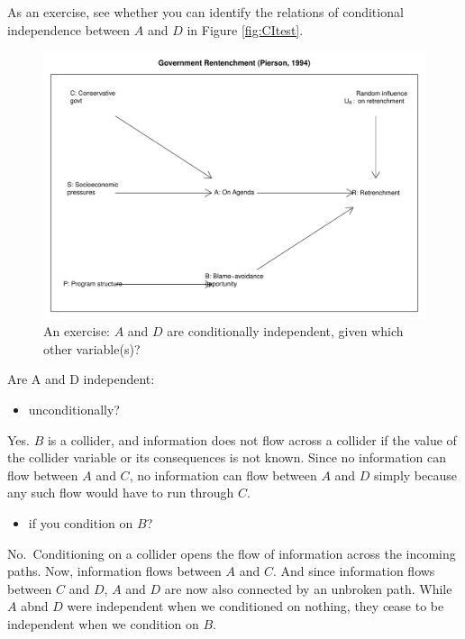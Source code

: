 \documentclass[12pt,]{book}
\providecommand{\tightlist}{%
  \setlength{\itemsep}{0pt}\setlength{\parskip}{0pt}}
\begin{document}
As an exercise, see whether you can identify the relations of conditional independence between \(A\) and \(D\) in Figure \ref{fig:CItest}.

\begin{figure}

{\centering \includegraphics[width=.9\textwidth]{ii_files/figure-latex/unnamed-chunk-7-1} 

}

\caption{\label{fig:CItest} An exercise: $A$ and $D$ are conditionally independent, given which other variable(s)?}\label{fig:unnamed-chunk-7}
\end{figure}

Are A and D independent:

\begin{itemize}
\tightlist
\item
  unconditionally?
\end{itemize}

Yes. \(B\) is a collider, and information does not flow across a collider if the value of the collider variable or its consequences is not known. Since no information can flow between \(A\) and \(C\), no information can flow between \(A\) and \(D\) simply because any such flow would have to run through \(C\).

\begin{itemize}
\tightlist
\item
  if you condition on \(B\)?
\end{itemize}

No.~Conditioning on a collider opens the flow of information across the incoming paths. Now, information flows between \(A\) and \(C\). And since information flows between \(C\) and \(D\), \(A\) and \(D\) are now also connected by an unbroken path. While \(A\) abnd \(D\) were independent when we conditioned on nothing, they cease to be independent when we condition on \(B\).
\end{document}

